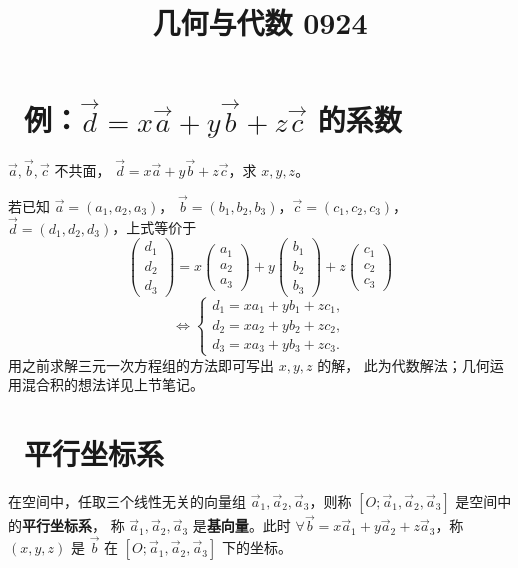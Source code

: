 \documentclass[UTF8,11pt]{ctexart}
\title{几何与代数 0924}
\date{}
\theoremstyle{cnthm}
\begin{document}
\maketitle

\section{\ 例：$\vec d=x\vec a+y\vec b+z\vec c$ 的系数}

$\vec a,\vec b,\vec c$ 不共面，
$\vec d=x\vec a+y\vec b+z\vec c$，求 $x,y,z$。

若已知 $\vec a=(a_1,a_2,a_3)$，
$\vec b=(b_1,b_2,b_3)$，$\vec c=(c_1,c_2,c_3)$，
$\vec d=(d_1,d_2,d_3)$，上式等价于
\[
\begin{pmatrix}
d_1\\d_2\\d_3
\end{pmatrix}
=x\begin{pmatrix}
a_1\\a_2\\a_3
\end{pmatrix}
+y\begin{pmatrix}
b_1\\b_2\\b_3
\end{pmatrix}
+z\begin{pmatrix}
c_1\\c_2\\c_3
\end{pmatrix}
\]
\[
\Longleftrightarrow
\begin{cases}
d_1=xa_1+yb_1+zc_1,\\
d_2=xa_2+yb_2+zc_2,\\
d_3=xa_3+yb_3+zc_3 .
\end{cases}
\]
用之前求解三元一次方程组的方法即可写出 $x,y,z$ 的解，
此为代数解法；几何运用混合积的想法详见上节笔记。

\section{\ 平行坐标系}

在空间中，任取三个线性无关的向量组
$\vec a_1,\vec a_2,\vec a_3$，则称
$[O;\vec a_1,\vec a_2,\vec a_3]$ 是空间中的\textbf{平行坐标系}，
称 $\vec a_1,\vec a_2,\vec a_3$ 是\textbf{基向量}。此时
$\forall\vec b=x\vec a_1+y\vec a_2+z\vec a_3$，称
$(x,y,z)$ 是 $\vec b$ 在
$[O;\vec a_1,\vec a_2,\vec a_3]$ 下的坐标。
\end{document}
